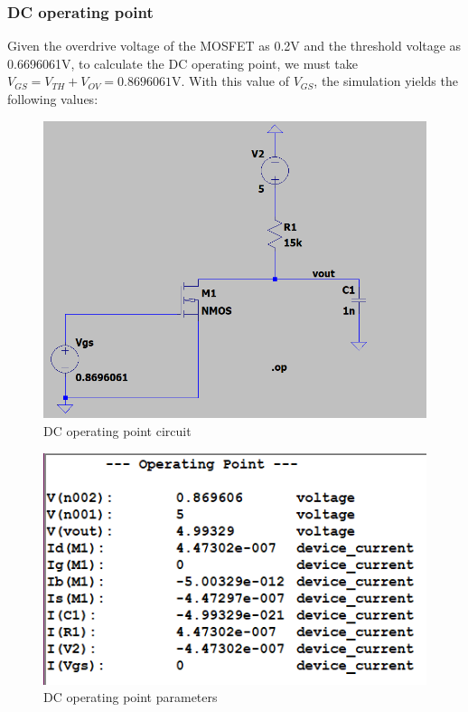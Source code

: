 \documentclass[titlepage]{article}
\begin{document}
\subsubsection{DC operating point}
Given the overdrive voltage of the MOSFET as 0.2V and the threshold voltage as 0.6696061V, to calculate the DC operating point, we must take\\
$V_{GS}=V_{TH}+V_{OV}=0.8696061$V. With this value of $V_{GS}$, the simulation yields the following values:
\begin{figure}[ht]
    \centering
    \includegraphics[scale=0.50]{resources/dcop.png}
    \caption{DC operating point circuit}
    \label{fig:dc_op}
\end{figure}
\begin{figure}[ht]
    \centering
    \includegraphics[scale=0.70]{resources/opparams.png}
    \caption{DC operating point parameters}
    \label{fig:dc_op_freq}
\end{figure}
\newpage
\end{document}
